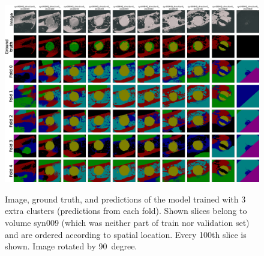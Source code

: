 \clearpage
\begin{figure}[!htb]
    \centering
    \includegraphics[clip,trim={0 0 0 7}, height=\textwidth, angle=90]{pictures/experiment_2/extra_clusters3_example_predictions_2_all_folds}\\
    \caption[Predictions with Three Extra Clusters]{Image, ground truth, and predictions of the model trained with 3 extra clusters (predictions from each fold). Shown slices belong to volume syn009 (which was neither part of train nor validation set) and are ordered according to spatial location. Every 100th slice is shown. Image rotated by 90~degree.}
    \label{fig:extra_clusters3-predictions-syn009-by-fold}
\end{figure}

